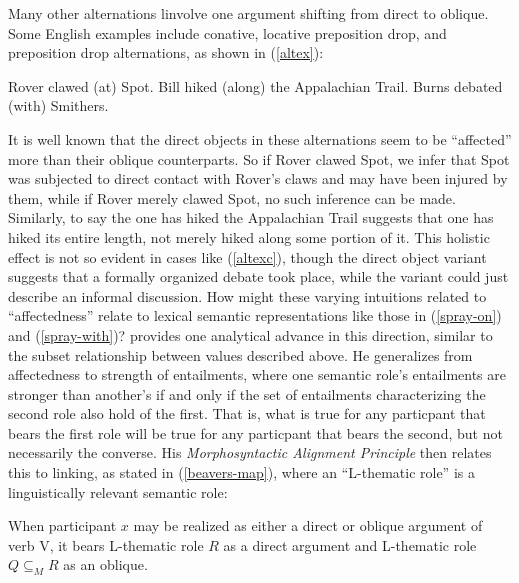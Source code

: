 \documentclass[output=paper]{langsci/langscibook}
\begin{document}
Many other alternations linvolve one argument shifting from direct to oblique.
Some English examples include conative, locative preposition drop, and  preposition drop alternations, as shown in (\ref{altex}):

\begin{exe}\ex\label{altex}
\begin{xlist}
\ex \label{altexa} Rover clawed (at) Spot. 
\ex \label{altexb} Bill hiked (along) the Appalachian Trail.
\ex \label{altexc} Burns debated (with) Smithers.
\end{xlist}
\end{exe}

It is well known that the direct objects in these alternations seem to be ``affected'' more than their oblique counterparts.
So if Rover clawed Spot, we infer that Spot was subjected to direct contact with Rover's claws and may have been injured by them, while if Rover merely clawed  Spot, no such inference can be made.
Similarly, to say the one has hiked the Appalachian Trail suggests that one has hiked its entire length, not merely hiked along some portion of it.
This holistic effect is not so evident in cases like (\ref{altexc}), though the direct object variant suggests that a formally organized debate took place, while the  variant could just describe an informal discussion.
How might these varying intuitions related to ``affectedness'' relate to lexical semantic representations like those in (\ref{spray-on}) and (\ref{spray-with})?
\citet{Beavers2010} provides one analytical advance in this direction, similar to the subset relationship between \rels values described above.
He generalizes from affectedness to strength of entailments, where one semantic role's entailments are stronger than another's if and only if the set of entailments characterizing the second role also hold of the first.
That is, what is true for any particpant that bears the first role will be true for any particpant that bears the second, but not necessarily the converse.
His \emph{Morphosyntactic Alignment Principle} then relates this to linking, as stated in (\ref{beavers-map}), where an ``L-thematic role'' is a linguistically relevant semantic role:

\begin{exe}
\ex\label{beavers-map}
When participant $x$ may be realized as either a direct or oblique argument of verb V, it bears L-thematic role $R$ as a direct argument and L-thematic role $Q\subseteq_{M}R$ as an oblique.
\citep[848]{Beavers2010}
\end {exe}
\end{document}
